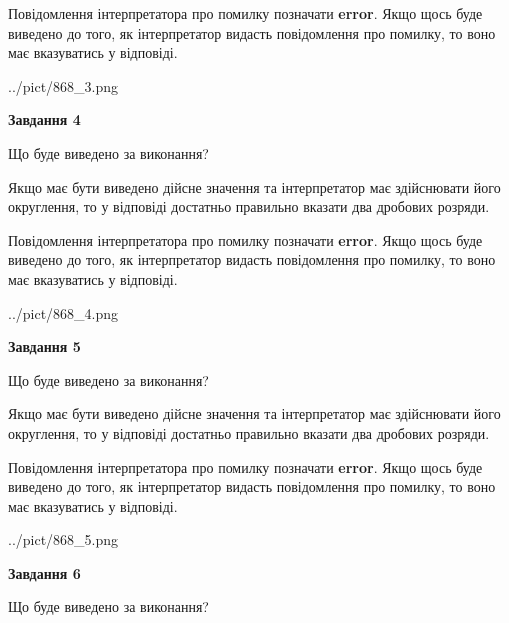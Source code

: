 \documentclass[12pt, ukrainian]{article}
\begin{document}
{\begin {Large}
Повідомлення інтерпретатора про помилку позначати \textbf{error}.
Якщо щось буде виведено до того, як інтерпретатор видасть повідомлення про помилку, 
то воно має вказуватись у відповіді. \par

\begin{center}
	{../pict/868_3.png}
\end{center}
\newpage

{\begin {center}\textbf{Завдання 4}\end {center}}\par
Що буде виведено за виконання? \par

Якщо має бути виведено дійсне значення та інтерпретатор має здійснювати його округлення, 
то у відповіді достатньо правильно вказати два дробових розряди.

Повідомлення інтерпретатора про помилку позначати \textbf{error}.
Якщо щось буде виведено до того, як інтерпретатор видасть повідомлення про помилку, 
то воно має вказуватись у відповіді. \par

\begin{center}
	{../pict/868_4.png}
\end{center}
\newpage

{\begin {center}\textbf{Завдання 5}\end {center}}\par
Що буде виведено за виконання? \par

Якщо має бути виведено дійсне значення та інтерпретатор має здійснювати його округлення, 
то у відповіді достатньо правильно вказати два дробових розряди.

Повідомлення інтерпретатора про помилку позначати \textbf{error}.
Якщо щось буде виведено до того, як інтерпретатор видасть повідомлення про помилку, 
то воно має вказуватись у відповіді. \par

\begin{center}
	{../pict/868_5.png}
\end{center}
\newpage

{\begin {center}\textbf{Завдання 6}\end {center}}\par
Що буде виведено за виконання? \par


\end{Large}}
\end{document}
